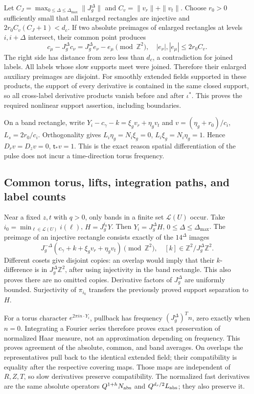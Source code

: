 \documentclass[10pt,a4paper]{article}
\begin{document}
Let \(C_J=\max_{0\le\Delta\le\Delta_{\max}}\|J_g^\Delta\|\) and \(C_v=\|v_r\|+\|v_t\|\). Choose \(r_0>0\) sufficiently small that all enlarged rectangles are injective and \(2r_0 C_v(C_J+1)<d_c\). If two absolute preimages of enlarged rectangles at levels \(i,i+\Delta\) intersect, their common point produces \[
c_\mu-J_g^\Delta c_\nu=J_g^\Delta e_\nu-e_\mu\pmod{\mathbb Z^2},
\quad |e_\nu|,|e_\mu|\le2r_0C_v.
\] The right side has distance from zero less than \(d_c\), a contradiction for joined labels. All labels whose slow supports meet were joined. Therefore their enlarged auxiliary preimages are disjoint. For smoothly extended fields supported in these products, the support of every derivative is contained in the same closed support, so all cross-label derivative products vanish before and after \(\iota^*\). This proves the required nonlinear support assertion, including boundaries.

On a band rectangle, write \(Y_i-c_\gamma-k=\xi_gv_r+\eta_gv_t\) and \(v=(\eta_g+r_0)/c_i\), \(L_s=2r_0/c_i\). Orthogonality gives \(L_i\eta_g=N_i\xi_g=0\), \(L_i\xi_g=N_i\eta_g=1\). Hence \(D_rv=D_zv=0\), \(\mathsf t_*v=1\). This is the exact reason spatial differentiation of the pulse does not incur a time-direction torus frequency.

\subsection{Common torus, lifts, integration paths, and label counts}\label{common-torus-lifts-integration-paths-and-label-counts}

Near a fixed \(z,t\) with \(q>0\), only bands in a finite set \(\mathcal L(U)\) occur. Take \(i_0=\min_{\ell\in\mathcal L(U)}i(\ell)\), \(H=J_g^{i_0}Y\). Then \(Y_i=J_g^\Delta H\), \(0\le\Delta\le\Delta_{\max}\). The preimage of an injective rectangle consists exactly of the \(14^\Delta\) images \[
J_g^{-\Delta}(c_\gamma+k+\xi_gv_r+\eta_gv_t)\pmod {\mathbb Z^2},
\quad[k]\in\mathbb Z^2/J_g^\Delta\mathbb Z^2.
\] Different cosets give disjoint copies: an overlap would imply that their \(k\)-difference is in \(J_g^\Delta\mathbb Z^2\), after using injectivity in the band rectangle. This also proves there are no omitted copies. Derivative factors of \(J_g^\Delta\) are uniformly bounded. Surjectivity of \(\pi_{i_0}\) transfers the previously proved support separation to \(H\).

For a torus character \(e^{2\pi i n\cdot Y_i}\), pullback has frequency \((J_g^\Delta)^Tn\), zero exactly when \(n=0\). Integrating a Fourier series therefore proves exact preservation of normalized Haar measure, not an approximation depending on frequency. This proves agreement of the absolute, common, and band averages. On overlaps the representatives pull back to the identical extended field; their compatibility is equality after the respective covering maps. Those maps are independent of \(R,Z,T\), so slow derivatives preserve compatibility. The normalized fast derivatives are the same absolute operators \(Q^{1+h}N_{\rm abs}\) and \(Q^{d_r/2}L_{\rm abs}\); they also preserve it.
\end{document}
